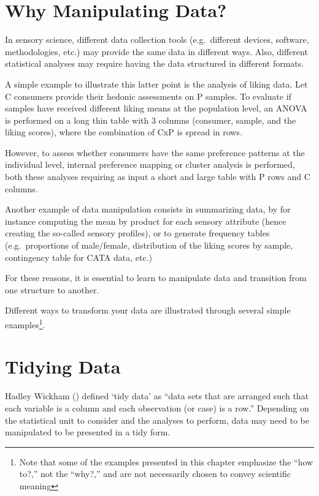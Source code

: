 \documentclass[
]{book}
\begin{document}
\hypertarget{why-manipulating-data}{%
\section{Why Manipulating Data?}\label{why-manipulating-data}}

In sensory science, different data collection tools (e.g.~different devices, software, methodologies, etc.) may provide the same data in different ways. Also, different statistical analyses may require having the data structured in different formats.

A simple example to illustrate this latter point is the analysis of liking data.
Let C consumers provide their hedonic assessments on P samples. To evaluate if samples have received different liking means at the population level, an ANOVA is performed on a long thin table with 3 columns (consumer, sample, and the liking scores), where the combination of CxP is spread in rows.

However, to assess whether consumers have the same preference patterns at the individual level, internal preference mapping or cluster analysis is performed, both these analyses requiring as input a short and large table with P rows and C columns.

Another example of data manipulation consists in summarizing data, by for instance computing the mean by product for each sensory attribute (hence creating the so-called sensory profiles), or to generate frequency tables (e.g.~proportions of male/female, distribution of the liking scores by sample, contingency table for CATA data, etc.)

For these reasons, it is essential to learn to manipulate data and transition from one structure to another.

Different ways to transform your data are illustrated through several simple examples\footnote{Note that some of the examples presented in this chapter emphasize the ``how to?,'' not the ``why?,'' and are not necessarily chosen to convey scientific meaning}.

\hypertarget{tidy-data}{%
\section{Tidying Data}\label{tidy-data}}

Hadley Wickham (\citet{Wickham2014}) defined `tidy data' as ``data sets that are arranged such that each variable is a column and each observation (or case) is a row.'' Depending on the statistical unit to consider and the analyses to perform, data may need to be manipulated to be presented in a tidy form.
\end{document}
